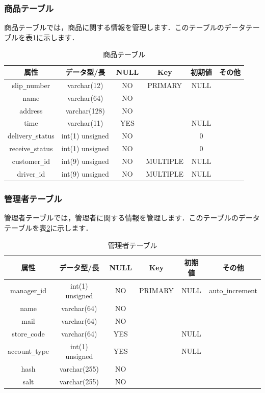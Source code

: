\documentclass[a4j,titlepage]{jarticle}
\begin{document}
\subsubsection{商品テーブル}
商品テーブルでは，商品に関する情報を管理します．このテーブルのデータテーブルを表\ref{delivery}に示します．
\begin{table}[htb]
  \caption{商品テーブル}
  \label{delivery}
  \begin{center}
    \begin{tabular}{|c|c|c|c|c|c|} \hline
      属性 & データ型/長 & NULL & Key & 初期値 & その他 \\ \hline \hline
      slip\verb|_|number & varchar(12) & NO & PRIMARY & NULL & \\ \hline
      name & varchar(64) & NO &   &  & \\ \hline
      address & varchar(128) & NO &   &  & \\ \hline
      time & varchar(11) & YES &   & NULL & \\ \hline
      delivery\verb|_|status & int(1) unsigned & NO &   & 0 & \\ \hline
      receive\verb|_|status & int(1) unsigned & NO &  & 0 & \\ \hline
      customer\verb|_|id & int(9) unsigned & NO & MULTIPLE & NULL & \\ \hline
      driver\verb|_|id & int(9) unsigned & NO & MULTIPLE & NULL & \\ \hline
    \end{tabular}
  \end{center}
\end{table}

\subsubsection{管理者テーブル}
管理者テーブルでは，管理者に関する情報を管理します．このテーブルのデータテーブルを表\ref{manager}に示します．
\begin{table}[htb]
  \caption{管理者テーブル}
  \label{manager}
  \begin{center}
    \begin{tabular}{|c|c|c|c|c|c|} \hline
      属性 & データ型/長 & NULL & Key & 初期値 & その他 \\ \hline \hline
      manager\verb|_|id & int(1) unsigned & NO & PRIMARY & NULL & auto\verb|_|increment\\ \hline
      name & varchar(64) & NO &   &  & \\ \hline
      mail & varchar(64) & NO &  &  & \\ \hline
      store\verb|_|code & varchar(64) & YES &   & NULL & \\ \hline
      account\verb|_|type & int(1) unsigned & YES &   & NULL & \\ \hline
      hash & varchar(255) & NO &   &  & \\ \hline
      salt & varchar(255) & NO &   &  & \\ \hline
    \end{tabular}
  \end{center}
\end{table}
\end{document}
